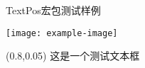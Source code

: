 \documentclass{ctexbeamer}
\begin{document}
\begin{frame}{TextPos宏包}{测试样例}

 \begin{center}
   \texttt{[image: example-image]}
 \end{center}
 
 \setlength{\TPHorizModule}{\textwidth}
 \setlength{\TPVertModule}{\textwidth}
 
 \begin{textblock}{0.33}(0.8,0.05)
   这是一个测试文本框
 \end{textblock}
\end{frame}
\end{document}
